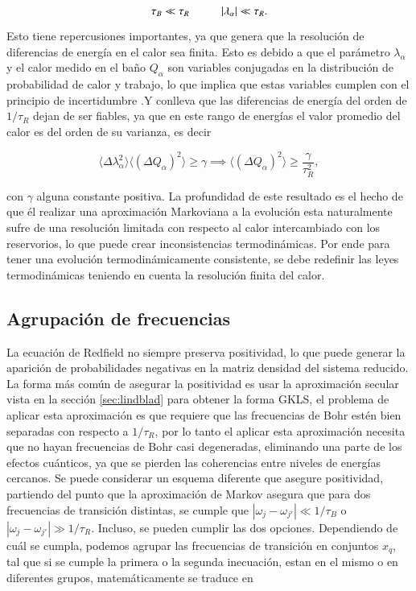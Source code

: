 \begin{equation*}
    \tau_{B} \ll \tau_{R} \hspace{10mm} |\lambda_{\alpha}| \ll \tau_{R}.
\end{equation*}

Esto tiene repercusiones importantes, ya que genera que la resolución de diferencias de energía en el calor sea finita. Esto es debido a que el parámetro $\lambda_{\alpha}$ y el calor medido en el baño $Q_{\alpha}$ son variables conjugadas en la distribución de probabilidad de calor y trabajo, lo que implica que estas variables cumplen con el principio de incertidumbre \cite{folland1997uncertainty}.Y conlleva que las diferencias de energía del orden de $1/\tau_{R}$ dejan de ser fiables, ya que en este rango de energías el valor promedio del calor es del orden de su varianza, es decir

\begin{equation*}
    \langle \Delta \lambda^{2}_{\alpha} \rangle \langle (\Delta Q_{\alpha})^{2}\rangle \geq \gamma \implies \langle (\Delta Q_{\alpha})^{2}\rangle  \geq \frac{\gamma}{\tau^{2}_{R}},
\end{equation*}

con $\gamma$ alguna constante positiva. La profundidad de este resultado es el hecho de que él realizar una aproximación Markoviana a la evolución esta naturalmente sufre de una resolución limitada con respecto al calor intercambiado con los reservorios, lo que puede crear inconsistencias termodinámicas. Por ende para tener una evolución termodinámicamente consistente, se debe redefinir las leyes termodinámicas teniendo en cuenta la resolución finita del calor.

\label{sec2:finiteresol}

\subsection{Agrupación de frecuencias}
La ecuación de Redfield no siempre preserva positividad, lo que puede generar la aparición de probabilidades negativas en la matriz densidad del sistema reducido. La forma más común de asegurar la positividad es usar la aproximación secular vista en la sección \ref{sec:lindblad} para obtener la forma GKLS, el problema de aplicar esta aproximación es que requiere que las frecuencias de Bohr estén bien separadas con respecto a $1/\tau_{R}$, por lo tanto el aplicar esta aproximación necesita que no hayan frecuencias de Bohr casi degeneradas, eliminando una parte de los efectos cuánticos, ya que se pierden las coherencias entre niveles de energías cercanos\cite{trushechkin2021unified}. Se puede considerar un esquema diferente que asegure positividad, partiendo del punto que la aproximación de Markov asegura que para dos frecuencias de transición distintas, se cumple que $|\omega_{j} - \omega_{j'}|\ll 1/\tau_{B}$ o $|\omega_{j}-\omega_{j'}|\gg 1/\tau_{R}$. Incluso, se pueden cumplir las dos opciones. Dependiendo de cuál se cumpla, podemos agrupar las frecuencias de transición en conjuntos $x_{q}$, tal que si se cumple la primera o la segunda inecuación, estan en el mismo o en diferentes grupos, matemáticamente se traduce en

